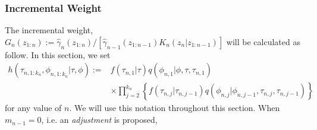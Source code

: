 \documentclass[12pt,a4paper]{article}
\begin{document}
\subsubsection{Incremental Weight}
The incremental weight, $G_n\left(z_{1:n}\right):= \hat{\gamma}_n\left(z_{1:n}\right) / \left[\hat{\gamma}_{n-1}\left(z_{1:n-1}\right)K_n\left(z_{n}|z_{1:n-1}\right)\right]$ will be calculated as follow. In this section, we set     
\begin{equation*}
        \begin{split}
            h\left(\tau_{n,1:k_n},\phi_{n,1:k_n}|\tau,\phi \right) := &f\left(\tau_{n,1}| \tau\right) q\left(\phi_{n,1}|\phi,\tau,\tau_{n,1}\right)\\
             & \times \prod_{j=2}^{k_n} \left\{f(\tau_{n,j}|\tau_{n,j-1})q(\phi_{n,j}|\phi_{n,j-1},\tau_{n,j},\tau_{n,j-1})\right\}
        \end{split}
\end{equation*}
for any value of $n$. We will use this notation throughout this section. 
When $m_{n-1} = 0$, i.e. an \textit{adjustment} is proposed,
\end{document}

